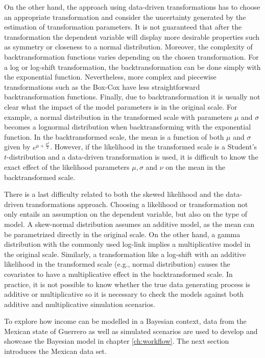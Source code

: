On the other hand, the approach using data-driven transformations has to choose an appropriate transformation and consider the uncertainty generated by the estimation of transformation parameters.
It is not guaranteed that after the transformation the dependent variable will display more desirable properties such as symmetry or closeness to a normal distribution.
Moreover, the complexity of backtransformation functions varies depending on the chosen transformation.
For a log or log-shift transformation, the backtransformation can be done simply with the exponential function.
Nevertheless, more complex and piecewise transformations such as the Box-Cox have less straightforward backtransformation functions.
Finally, due to backtransformation it is usually not clear what the impact of the model parameters is in the original scale.
For example, a normal distribution in the transformed scale with parameters $\mu$ and $\sigma$ becomes a lognormal distribution when backtransforming with the exponential function.
In the backtransformed scale, the mean is a function of both $\mu$ and $\sigma$ given by $e^{\mu + \frac{\sigma^2}{2}}$.
However, if the likelihood in the transformed scale is a Student's $t$-distribution and a data-driven transformation is used, it is difficult to know the exact effect of the likelihood parameters $\mu, \sigma$ and $\nu$ on the mean in the backtransformed scale.

There is a last difficulty related to both the skewed likelihood and the data-driven transformations approach.
Choosing a likelihood or transformation not only entails an assumption on the dependent variable, but also on the type of model.
A skew-normal distribution assumes an additive model, as the mean can be parametrized directly in the original scale. On the other hand, a gamma distribution with the commonly used log-link implies a multiplicative model in the original scale.
Similarly, a transformation like a log-shift with an additive likelihood in the transformed scale (e.g., normal distribution) causes the covariates to have a multiplicative effect in the backtransformed scale.
In practice, it is not possible to know whether the true data generating process is additive or multiplicative so it is necessary to check the models against both additive and multiplicative simulation scenarios.

To explore how income can be modelled in a Bayesian context, data from the Mexican state of Guerrero as well as simulated scenarios are used to develop and showcase the Bayesian model in chapter \ref{ch:workflow}.
The next section introduces the Mexican data set.

